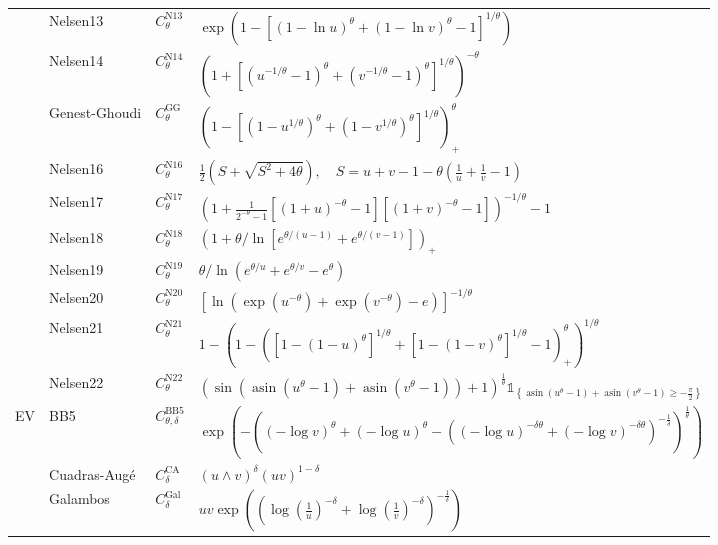 \documentclass{article}
\DeclareMathOperator{\asin}{asin}  %
\def\1{\mathds{1}} %
\def\of#1{\left(#1\right)} %
\def\setof#1{\left\{#1\right\}} %
\begin{document}
\begin{table}[tbp]
\begin{center}
{\begin{tabular}{llll}
            & Nelsen13 & $C^{\text{N13}}_{\theta}$ & $\exp \left(1-\left[(1-\ln u)^\theta+(1-\ln v)^\theta-1\right]^{1 / \theta}\right)$\\
            & Nelsen14 & $C^{\text{N14}}_{\theta}$ & $\left(1+\left[(u^{-1 / \theta}-1)^\theta+(v^{-1 / \theta}-1)^\theta\right]^{1 / \theta}\right)^{-\theta}$\\
            & Genest-Ghoudi & $C^{\text{GG}}_{\theta}$ & $\left(1-\left[(1-u^{1 / \theta})^\theta+(1-v^{1 / \theta})^\theta\right]^{1 / \theta}\right)_+^\theta$\\
            & Nelsen16 & $C^{\text{N16}}_{\theta}$ & $\frac{1}{2}\left(S+\sqrt{S^2+4 \theta}\right), \quad S=u+v-1-\theta\left(\frac{1}{u}+\frac{1}{v}-1\right)$\\
            & Nelsen17 & $C^{\text{N17}}_{\theta}$ & $\left(1+\frac{1}{2^{-\theta}-1}\left[(1+u)^{-\theta}-1\right]\left[(1+v)^{-\theta}-1\right]\right)^{-1 / \theta}-1$\\
            & Nelsen18 & $C^{\text{N18}}_{\theta}$ & $\left(1+\theta / \ln \left[e^{\theta /(u-1)}+e^{\theta /(v-1)}\right]\right)_+$\\
            & Nelsen19 & $C^{\text{N19}}_{\theta}$ & $\theta / \ln (e^{\theta / u}+e^{\theta / v}-e^\theta)$\\
            & Nelsen20 & $C^{\text{N20}}_{\theta}$ & $\left[\ln \left(\exp \left(u^{-\theta}\right)+\exp \left(v^{-\theta}\right)-e\right)\right]^{-1 / \theta}$\\
            & Nelsen21 & $C^{\text{N21}}_{\theta}$ & $1-\left(1-\left(\left[1-(1-u)^\theta\right]^{1 / \theta}+\left[1-(1-v)^\theta\right]^{1 / \theta}-1\right)_+^\theta\right)^{1 / \theta}$\\
            & Nelsen22 & $C^{\text{N22}}_{\theta}$ & $\left(\sin\left(\asin(u^{\theta} - 1 ) + \asin(v^{\theta} - 1 ) \right) + 1\right)^{\frac{1}{\theta}}\1_{\setof{\asin(u^{\theta} - 1 ) + \asin(v^{\theta} - 1 ) \geq - \frac{\pi}{2}}}$\\
            \midrule
            EV & BB5 & $C^{\text{BB5}}_{\theta,\delta}$ & $\exp\of{-\left((-\log v)^{\theta} + (-\log u)^{\theta} - \left((-\log u)^{- \delta \theta} + (-\log v)^{- \delta \theta}\right)^{- \frac{1}{\delta}}\right)^{\frac{1}{\theta}}}$ \\
            & Cuadras-Augé & $C^{\text{CA}}_{\delta}$ & $(u\wedge v)^{\delta}(uv)^{1-\delta}$ \\
            & Galambos & $C^{\text{Gal}}_{\delta}$ & $uv\exp\of{\left(\log\of{\frac1u}^{- \delta} + \log\of{\frac1v}^{- \delta}\right)^{- \frac{1}{\delta}}} $ \\

\end{tabular}}
\end{center}
\end{table}
\end{document}
